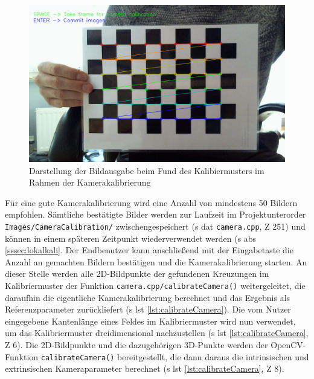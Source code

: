 \begin{figure}[H]
\centering
\includegraphics[width=13cm]{Bilder/Implementierung/live_calibration.png}
\caption{Darstellung der Bildausgabe beim Fund des Kalibiermusters im Rahmen der Kamerakalibrierung}
\label{fig:live_calibration}
\end{figure}

\noindent Für eine gute Kamerakalibrierung wird eine Anzahl von mindestens 50 Bildern empfohlen. Sämtliche bestätigte Bilder werden zur Laufzeit im Projektunterorder \glqq \texttt{Images/CameraCalibration/}\grqq{} zwischengespeichert (\acs{s} \acs{dat} \texttt{camera.cpp}, \acs{Z} 251) und können in einem späteren Zeitpunkt wiederverwendet werden (\acs{s} \acs{abs} \ref{sssec:lokalkali}. Der Endbenutzer kann anschließend mit der Eingabetaste die Anzahl an gemachten Bildern bestätigen und die Kamerakalibrierung starten. An dieser Stelle werden alle 2D-Bildpunkte der gefundenen Kreuzungen im Kalibriermuster der Funktion \texttt{camera.cpp/calibrateCamera()} weitergeleitet, die daraufhin die eigentliche Kamerakalibrierung berechnet und das Ergebnis als Referenzparameter zurückliefert (\acs{s} \acs{lst} \ref{lst:calibrateCamera}). Die vom Nutzer eingegebene Kantenlänge eines Feldes im Kalibriermuster wird nun verwendet, um das Kalibriermuster dreidimensional nachzustellen (\acs{s} \acs{lst} \ref{lst:calibrateCamera}, \acs{Z} 6). Die 2D-Bildpunkte und die dazugehörigen 3D-Punkte werden der OpenCV-Funktion \texttt{calibrateCamera()} bereitgestellt, die dann daraus die intrinsischen und extrinsischen Kameraparameter berechnet (\acs{s} \acs{lst} \ref{lst:calibrateCamera}, \acs{Z} 8).

